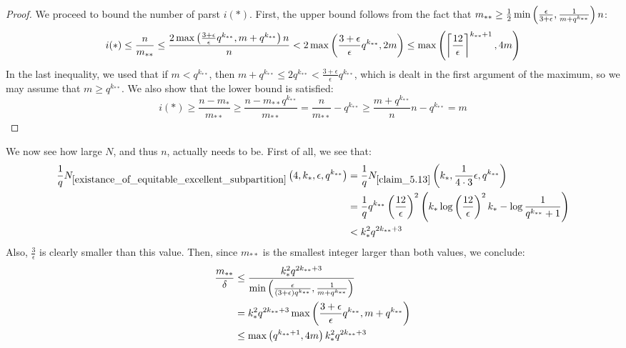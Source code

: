 \begin{proof}
            We proceed to bound the number of parst $i(*)$.
            First, the upper bound follows from the fact that
            $m_{**} \geq \frac{1}{2} \min \left( \frac{\epsilon} {3 + \epsilon}, \frac{1}{m + q^{k_{**}}} \right) n$:
            \[
                i(*) \leq \frac{n}{m_{**}} \leq \frac{2 \max \left( \frac{3 + \epsilon}{\epsilon} q^{k_{**}}, m + q^{k_{**}} \right)n}{n}
                     < 2 \max \left( \frac{3 + \epsilon}{\epsilon} q^{k_{**}}, 2m \right)
                     \leq \max \left( \left\lceil \frac{12}{\epsilon} \right\rceil^{k_{**}+1}, 4m \right)
            \]
            In the last inequality, we used that if $m < q^{k_{**}}$, then $m + q^{k_{**}} \leq 2q^{k_{**}} < \frac{3 + \epsilon}{\epsilon} q^{k_{**}}$,
            which is dealt in the first argument of the maximum, so we may assume that $m \geq q^{k_{**}}$.
            We also show that the lower bound is satisfied:
            \[
                i(*) \geq \frac{n - m_*}{m_{**}}
                     \geq \frac{n - m_{**}q^{k_{**}}}{m_{**}}
                     = \frac{n}{m_{**}} - q^{k_{**}}
                     \geq \frac{m + q^{k_{**}}}{n} n - q^{k_{**}}
                     = m
            \]
        \end{proof}

    \begin{remark}
        We now see how large $N$, and thus $n$, actually needs to be.
        First of all, we see that:
        \begin{align*}
            \frac{1}{q} N_{\ref{existance_of_equitable_excellent_subpartition}}\left( 4, k_*, \epsilon, q^{k_{**}} \right)
                & = \frac{1}{q} N_{\ref{claim_5.13}}\left( k_*, \frac{1}{4 \cdot 3} \epsilon, q^{k_{**}} \right) \\
                & = \frac{1}{q} q^{k_{**}} \left( \frac{12}{\epsilon} \right)^2
                    \left( k_* \log{\left( \frac{12}{\epsilon} \right)^2 k_*} - \log{\frac{1}{q^{k_{**}}+1}} \right) \\
                & < k_*^2 q^{2 k_{**} + 3}
        \end{align*}
        Also, $\frac{3}{\epsilon}$ is clearly smaller than this value.
        Then, since $m_{**}$ is the smallest integer larger than both values, we conclude:
        \begin{align*}
            \frac{m_{**}}{\delta}
                & \leq \frac{k_*^2 q^{2 k_{**} + 3}}
                    {\min \left( \frac{\epsilon}{\left( 3 + \epsilon \right) q^{k_{**}}}, \frac{1}{m + q^{k_{**}}} \right)} \\
                & = k_*^2 q^{2 k_{**} + 3} \max \left( \frac{3 + \epsilon}{\epsilon} q^{k_{**}}, m + q^{k_{**}} \right) \\
                & \leq \max \left( q^{k_{**} + 1}, 4m \right) k_*^2 q^{2 k_{**} + 3}
        \end{align*}
    \end{remark}

